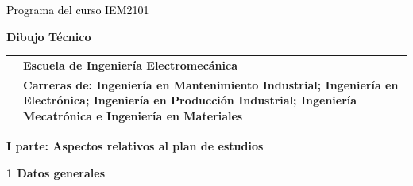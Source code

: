 \documentclass[letterpaper]{article}%
\begin{document}
%
\normalsize%
\thispagestyle{empty}%
%
\vspace*{150mm}%
\par\fontsize{14}{0}\selectfont \textcolor{black}{Programa del curso IEM2101}%
\par\fontsize{18}{25}\selectfont \textbf{\textcolor{azulsuaveTEC}{Dibujo Técnico}}%
\renewcommand{\arraystretch}{0.7}%
\begin{longtable}{m{}m{}}%
&\hspace*{0mm}\fontsize{12}{14}\selectfont \textbf{\textcolor{gris}{Escuela de Ingeniería Electromecánica}}\\%
&\hspace*{0mm}\fontsize{12}{14}\selectfont \textbf{\textcolor{gris}{Carreras de: Ingeniería en Mantenimiento Industrial; Ingeniería en Electrónica; Ingeniería en Producción Industrial; Ingeniería Mecatrónica e Ingeniería en Materiales}}\\%
\end{longtable}%
\newpage%
\pagestyle{headfoot}%
\par\fontsize{14}{0}\selectfont \textbf{\textcolor{parte}{I parte: Aspectos relativos al plan de estudios}}%
\par\hspace*{4mm}\fontsize{12}{20}\selectfont \textbf{\textcolor{parte}{1 Datos generales}}%
\renewcommand{\arraystretch}{1.5}%
\end{document}

